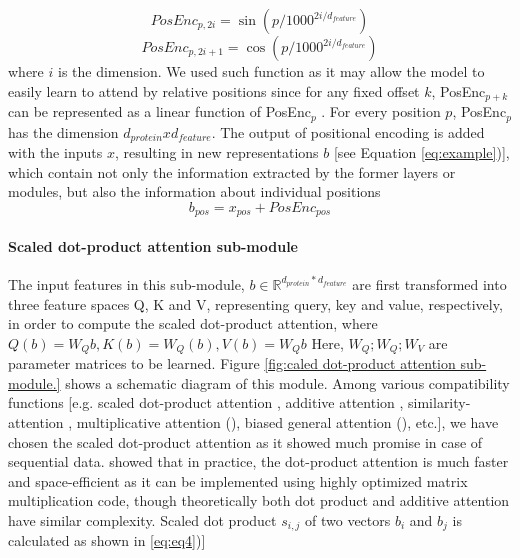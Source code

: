 \documentclass[8pt]{article}
\begin{document}
\begin{multicols}{2}
\begin{equation}
PosEnc_{p,2i} = \sin(p/1000^{2i/d_{feature}})
\end{equation}
\begin{equation}
PosEnc_{p,2i+1}  = \cos(p/1000^{2i/d_{feature}})
\end{equation}
where $i$ is the dimension. We used such function as it may allow the
model to easily learn to attend by relative positions since for any
fixed offset $k$, PosEnc$_{p+k}$ can be represented as a linear function of
PosEnc$_p$ \cite{vaswani2017attention}. For every position $p$, PosEnc$_p$ has
the dimension $d_{protein} x d_{feature}$. The output of positional encoding is
added with the inputs $x$, resulting in new representations $b$ [see Equation
\eqref{eq:example})], which contain not only the information extracted by
the former layers or modules, but also the information about individual positions
\begin{equation}
b_{pos} = x_{pos} + PosEnc_{pos}
\label{eq:example}
\end{equation}

\paragraph{Scaled dot-product attention sub-module}
The input features in this sub-module, $b \in \mathbb{R}^{d_{protein} * d_{feature}} $  are first transformed into
three feature spaces Q, K and V, representing query, key and value,
respectively, in order to compute the scaled dot-product attention,
where $Q(b) = W_Qb , K(b) = W_Q(b) , V(b)=W_Qb$ Here,
$W_Q; W_Q; W_V$ are parameter matrices to be learned. Figure  \ref{fig:caled dot-product attention sub-module.} shows
a schematic diagram of this module.
Among various compatibility functions [e.g. scaled dot-product
attention \cite{vaswani2017attention}, additive attention \cite{bahdanau2014neural}, similarity-attention \cite{graves2014neural}, multiplicative attention (\cite{luong2015effective}), biased general attention (\cite{sordoni2016iterative}), etc.], we have chosen the scaled dot-product attention
as it showed much promise in case of sequential data. \cite{vaswani2017attention} showed that in practice, the dot-product attention is much
faster and space-efficient as it can be implemented using highly optimized matrix multiplication code, though theoretically both dot product and additive attention have similar complexity. Scaled dot product $s_{i,j}$ of two vectors $b_i$ and  $b_j$ is calculated as shown in
\eqref{eq:eq4})]


\end{multicols}
\end{document}
